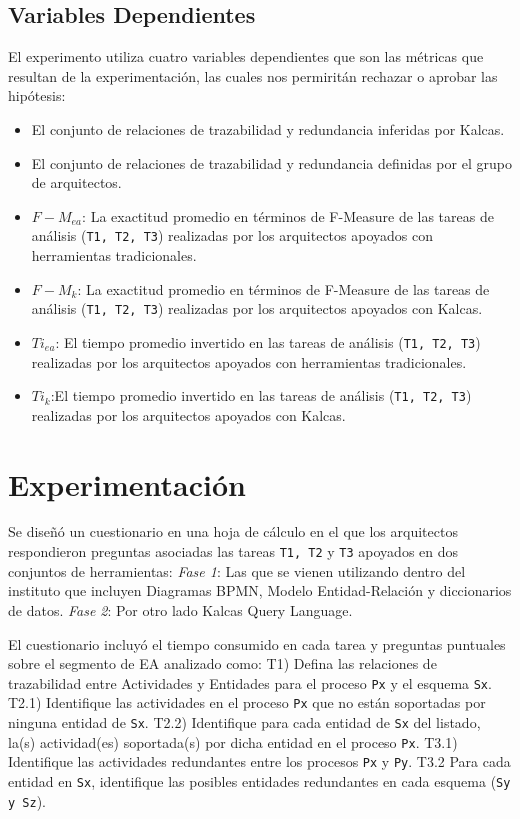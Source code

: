 \subsection{Variables Dependientes}
El experimento utiliza cuatro variables dependientes que son las m\'etricas que resultan de la experimentaci\'on, las cuales nos permirit\'an rechazar o aprobar las hip\'otesis: 
\begin{itemize}
\item El conjunto de relaciones de trazabilidad y redundancia inferidas por Kalcas.
\item El conjunto de relaciones de trazabilidad y redundancia definidas por el grupo de arquitectos.
\item $F-M_{ea}$: La exactitud promedio en t\'erminos de F-Measure de las tareas de an\'alisis (\texttt{T1, T2, T3}) realizadas por los arquitectos apoyados con herramientas tradicionales.
\item $F-M_{k}$: La exactitud promedio en t\'erminos de F-Measure de las tareas de an\'alisis (\texttt{T1, T2, T3}) realizadas por los arquitectos apoyados con Kalcas.
\item $Ti_{ea}$: El tiempo promedio invertido en las tareas de an\'alisis (\texttt{T1, T2, T3}) realizadas por los arquitectos apoyados con herramientas tradicionales.
\item $Ti_{k}$:El tiempo promedio invertido en las tareas de an\'alisis (\texttt{T1, T2, T3}) realizadas por los arquitectos apoyados con Kalcas.
\end{itemize}

\section{Experimentaci\'on} \label{sec:experimentacion}

Se dise\~n\'o un cuestionario en una hoja de c\'alculo en el que los arquitectos respondieron preguntas asociadas las tareas \texttt{T1, T2} y \texttt{T3} apoyados en dos conjuntos de herramientas: \textit{Fase 1}: Las que se vienen utilizando dentro del instituto que incluyen Diagramas BPMN, Modelo Entidad-Relaci\'on y diccionarios de datos. \textit{Fase 2}: Por otro lado Kalcas Query Language. 

El cuestionario incluy\'o el tiempo consumido en cada tarea y preguntas puntuales sobre el segmento de EA analizado como: T1) Defina las relaciones de trazabilidad entre Actividades y Entidades para el proceso \texttt{Px} y el esquema \texttt{Sx}. T2.1) Identifique las actividades en el proceso \texttt{Px} que no est\'an soportadas por ninguna entidad de \texttt{Sx}. T2.2) Identifique para cada entidad de \texttt{Sx} del listado, la(s) actividad(es) soportada(s) por dicha entidad en el proceso \texttt{Px}. T3.1) Identifique las actividades redundantes entre los procesos \texttt{Px} y \texttt{Py}. T3.2 Para cada entidad en \texttt{Sx}, identifique las posibles entidades redundantes en cada esquema (\texttt{Sy y Sz}).


